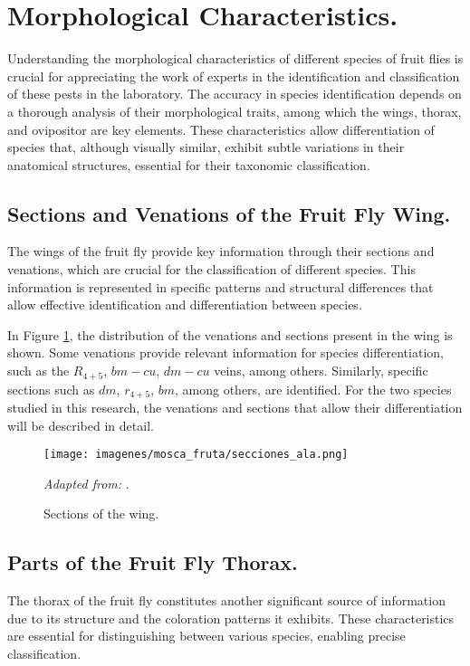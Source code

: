 \section{Morphological Characteristics.}
\label{sec:moscafruta}
Understanding the morphological characteristics of different species of fruit flies is crucial for appreciating the work of experts in the identification and classification of these pests in the laboratory. The accuracy in species identification depends on a thorough analysis of their morphological traits, among which the wings, thorax, and ovipositor are key elements. These characteristics allow differentiation of species that, although visually similar, exhibit subtle variations in their anatomical structures, essential for their taxonomic classification.

\subsection{Sections and Venations of the Fruit Fly Wing.}
The wings of the fruit fly provide key information through their sections and venations, which are crucial for the classification of different species. This information is represented in specific patterns and structural differences that allow effective identification and differentiation between species.

In Figure \ref{fig:taxonomiaala}, the distribution of the venations and sections present in the wing is shown. Some venations provide relevant information for species differentiation, such as the $R_{4+5}$, $bm{-}cu$, $dm{-}cu$ veins, among others. Similarly, specific sections such as $dm$, $r_{4+5}$, $bm$, among others, are identified. For the two species studied in this research, the venations and sections that allow their differentiation will be described in detail.

\begin{figure}[htbp]
    \centering
    \texttt{[image: imagenes/mosca\_fruta/secciones\_ala.png]}
    \caption{Sections of the wing.}
    \scriptsize \textit{Adapted from:} \cite{norrbom}.
    \label{fig:taxonomiaala}
\end{figure}

\subsection{Parts of the Fruit Fly Thorax.}
The thorax of the fruit fly constitutes another significant source of information due to its structure and the coloration patterns it exhibits. These characteristics are essential for distinguishing between various species, enabling precise classification.

